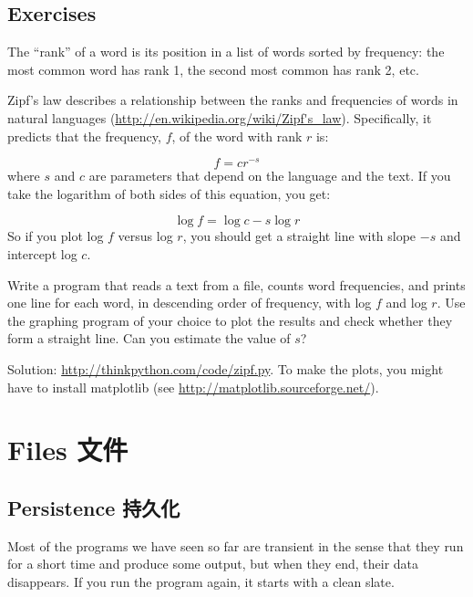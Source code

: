 \documentclass[10pt]{book}
\begin{document}
\begin{CJK}{UTF8}{gbsn}
\section{Exercises}

\begin{exercise}

The ``rank'' of a word is its position in a list of words
sorted by frequency: the most common word has rank 1, the
second most common has rank 2, etc.

Zipf's law describes a relationship between the ranks and frequencies
of words in natural languages
(\url{http://en.wikipedia.org/wiki/Zipf's_law}).  Specifically, it
predicts that the frequency, $f$, of the word with rank $r$ is:

\[ f = c r^{-s} \]
%
where $s$ and $c$ are parameters that depend on the language and the
text.  If you take the logarithm of both sides of this equation, you
get:

\[ \log f = \log c - s \log r \]
%
So if you plot log $f$ versus log $r$, you should get
a straight line with slope $-s$ and intercept log $c$.

Write a program that reads a text from a file, counts
word frequencies, and prints one line
for each word, in descending order of frequency, with
log $f$ and log $r$.  Use the graphing program of your
choice to plot the results and check whether they form
a straight line.  Can you estimate the value of $s$?

Solution: \url{http://thinkpython.com/code/zipf.py}.  To make the plots, you
might have to install matplotlib (see
\url{http://matplotlib.sourceforge.net/}).

\end{exercise}


\chapter{Files 文件}


\section{Persistence 持久化}

Most of the programs we have seen so far are transient in the
sense that they run for a short time and produce some output,
but when they end, their data disappears.  If you run the program
again, it starts with a clean slate.


\end{CJK}
\end{document}
